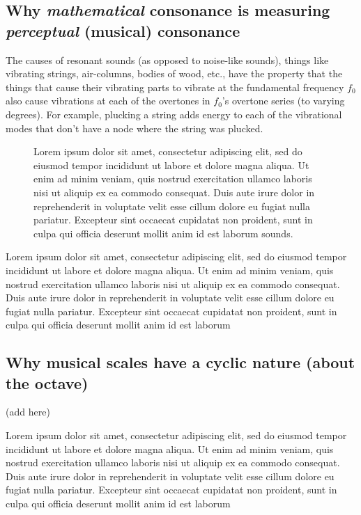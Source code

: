 \documentclass[letterpaper]{article}
\theoremstyle{definition}
\begin{document}
{\subsection{Why \emph{mathematical} consonance is measuring \emph{perceptual} (musical) consonance}
\label{perceptual}
The causes of resonant sounds (as opposed to noise-like sounds), things like vibrating strings, air-columns, bodies of wood, etc., have the property that the things that cause their vibrating parts to vibrate at the fundamental frequency $f_0$ also cause vibrations at each of the overtones in $f_0$'s overtone series (to varying degrees).  For example, plucking a string adds energy to each of the vibrational modes that don't have a node where the string was plucked. 

\begin{figure}
  \label{soundcomponents}
  \begin{center}  

    
  \end{center}
  \caption{Lorem ipsum dolor sit amet, consectetur adipiscing elit, sed do eiusmod tempor incididunt ut labore et dolore magna aliqua. Ut enim ad minim veniam, quis nostrud exercitation ullamco laboris nisi ut aliquip ex ea commodo consequat. Duis aute irure dolor in reprehenderit in voluptate velit esse cillum dolore eu fugiat nulla pariatur. Excepteur sint occaecat cupidatat non proident, sunt in culpa qui officia deserunt mollit anim id est laborum
sounds.}
\end{figure}
Lorem ipsum dolor sit amet, consectetur adipiscing elit, sed do eiusmod tempor incididunt ut labore et dolore magna aliqua. Ut enim ad minim veniam, quis nostrud exercitation ullamco laboris nisi ut aliquip ex ea commodo consequat. Duis aute irure dolor in reprehenderit in voluptate velit esse cillum dolore eu fugiat nulla pariatur. Excepteur sint occaecat cupidatat non proident, sunt in culpa qui officia deserunt mollit anim id est laborum
\subsection{Why musical scales have a cyclic nature (about the octave)}
\label{cyclic}
(add here)



Lorem ipsum dolor sit amet, consectetur adipiscing elit, sed do eiusmod tempor incididunt ut labore et dolore magna aliqua. Ut enim ad minim veniam, quis nostrud exercitation ullamco laboris nisi ut aliquip ex ea commodo consequat. Duis aute irure dolor in reprehenderit in voluptate velit esse cillum dolore eu fugiat nulla pariatur. Excepteur sint occaecat cupidatat non proident, sunt in culpa qui officia deserunt mollit anim id est laborum





}
\end{document}
